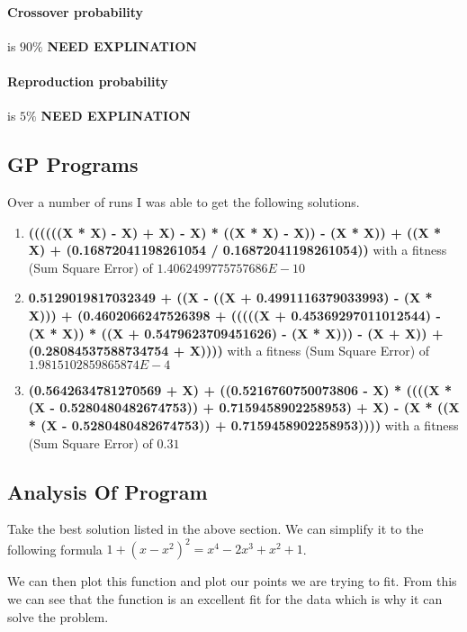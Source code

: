 \documentclass[a4paper, 12pt]{article}
\begin{document}
			\paragraph{Crossover probability} is $90\%$ \textbf{NEED EXPLINATION }
			
			\paragraph{Reproduction probability} is $5\%$ \textbf{NEED EXPLINATION}
			
			
		
		\subsection{GP Programs}
			Over a number of runs I was able to get the following solutions.
			
			\begin{enumerate}
				\item \textbf{((((((X * X) - X) + X) - X) * ((X * X) - X)) - (X * X)) + ((X * X) + (0.16872041198261054 / 0.16872041198261054))} with a fitness (Sum Square Error) of \textbf{$1.4062499775757686E-10$}
				
				\item \textbf{0.5129019817032349 + ((X - ((X + 0.4991116379033993) - (X * X))) + (0.4602066247526398 + (((((X + 0.45369297011012544) - (X * X)) * ((X + 0.5479623709451626) - (X * X))) - (X + X)) + (0.28084537588734754 + X))))} with a fitness (Sum Square Error) of \textbf{$1.9815102859865874E-4$}			
				
				\item \textbf{(0.5642634781270569 + X) + ((0.5216760750073806 - X) * ((((X * (X - 0.5280480482674753)) + 0.7159458902258953) + X) - (X * ((X * (X - 0.5280480482674753)) + 0.7159458902258953))))} with a fitness (Sum Square Error) of \textbf{$0.31$}
			\end{enumerate}
				
		
		\subsection{Analysis Of Program}
			Take the best solution listed in the above section. We can simplify it to the following formula $1 + (x - x^2)^2 = x^4 - 2x^3 + x^2 + 1$. 
			
			We can then plot this function and plot our points we are trying to fit. From this we can see that the function is an excellent fit for the data which is why it can solve the problem.
			
\end{document}

